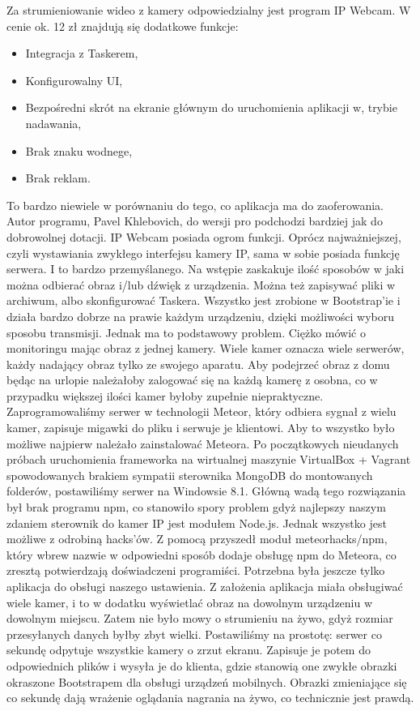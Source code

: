 \documentclass[brudnopis]{xmgr}
\begin{document}
Za strumieniowanie wideo z kamery odpowiedzialny jest program IP Webcam.
W cenie ok. 12 zł znajdują się dodatkowe funkcje:
\begin{itemize}
\item Integracja z Taskerem,
\item Konfigurowalny UI,
\item Bezpośredni skrót na ekranie głównym do uruchomienia aplikacji w, trybie nadawania,
\item Brak znaku wodnege,
\item Brak reklam.
\end{itemize}
To bardzo niewiele w porównaniu do tego, co aplikacja ma do zaoferowania. Autor programu, Pavel Khlebovich, do wersji pro  podchodzi bardziej jak do dobrowolnej dotacji.
IP Webcam posiada ogrom funkcji. Oprócz najważniejszej, czyli wystawiania zwykłego interfejsu kamery IP, sama w sobie posiada funkcję serwera. I to bardzo przemyślanego. Na wstępie zaskakuje ilość sposobów w jaki można odbierać obraz i/lub dźwięk z urządzenia. Można też zapisywać pliki w archiwum, albo skonfigurować Taskera. Wszystko jest zrobione w Bootstrap'ie i działa bardzo dobrze na prawie każdym urządzeniu, dzięki możliwości wyboru sposobu transmisji.
Jednak ma to podstawowy problem. Ciężko mówić o monitoringu mając obraz z jednej kamery. Wiele kamer oznacza wiele serwerów, każdy nadający obraz tylko ze swojego aparatu. Aby podejrzeć obraz z domu będąc na urlopie należałoby zalogować się na każdą kamerę z osobna, co w przypadku większej ilości kamer byłoby zupełnie niepraktyczne. Zaprogramowaliśmy serwer w technologii Meteor, który odbiera sygnał z wielu kamer, zapisuje migawki do pliku i serwuje je klientowi.
Aby to wszystko było możliwe najpierw należało zainstalować Meteora. Po początkowych nieudanych próbach uruchomienia frameworka na wirtualnej maszynie VirtualBox + Vagrant spowodowanych brakiem sympatii sterownika MongoDB do montowanych folderów, postawiliśmy serwer na Windowsie 8.1. Główną wadą tego rozwiązania był brak programu npm, co stanowiło spory problem gdyż najlepszy naszym zdaniem sterownik do kamer IP jest modułem Node.js. Jednak wszystko jest możliwe z odrobiną hacks'ów. Z pomocą przyszedł moduł meteorhacks/npm, który wbrew nazwie w odpowiedni sposób dodaje obsługę npm do Meteora, co zresztą potwierdzają doświadczeni programiści.
Potrzebna była jeszcze tylko aplikacja do obsługi naszego ustawienia. Z założenia aplikacja miała obsługiwać wiele kamer, i to w dodatku wyświetlać obraz na dowolnym urządzeniu w dowolnym miejscu. Zatem nie było mowy o strumieniu na żywo, gdyż rozmiar przesyłanych danych byłby zbyt wielki. Postawiliśmy na prostotę: serwer co sekundę odpytuje wszystkie kamery o zrzut ekranu. Zapisuje je potem do odpowiednich plików i wysyła je do klienta, gdzie stanowią one zwykłe obrazki okraszone Bootstrapem dla obsługi urządzeń mobilnych. Obrazki zmieniające się co sekundę dają wrażenie oglądania nagrania na żywo, co technicznie jest prawdą.
\end{document}

